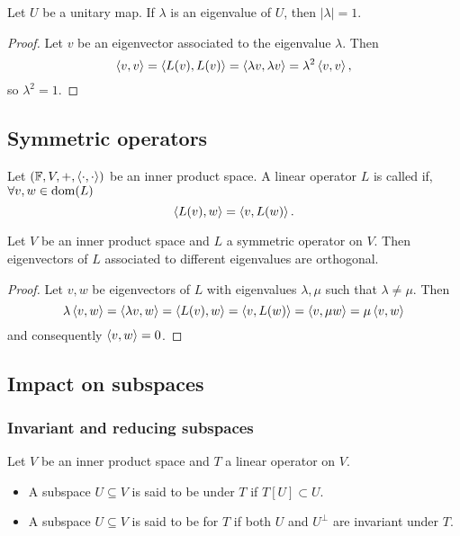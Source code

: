 \begin{lemma}
Let $U$ be a unitary map. If $\lambda$ is an eigenvalue of $U$, then $|\lambda| = 1$.
\end{lemma}
\begin{proof}
Let $v$ be an eigenvector associated to the eigenvalue $\lambda$. Then
\[ \left\langle v,v \right\rangle = \left\langle L(v),L(v) \right\rangle = \left\langle \lambda v, \lambda v \right\rangle = \lambda^2\left\langle v,v \right\rangle,  \]
so $\lambda^2 = 1$.
\end{proof}

\subsection{Symmetric operators}
\begin{definition}
Let $(\mathbb{F},V,+,\left\langle \cdot,\cdot \right\rangle)$ be an inner product space. A linear operator $L$ is called  if, $\forall v,w\in \operatorname{dom}(L)$
\[ \left\langle L(v),w \right\rangle = \left\langle v,L(w) \right\rangle. \]
\end{definition}

\begin{proposition}
Let $V$ be an inner product space and $L$ a symmetric operator on $V$. Then eigenvectors of $L$ associated to different eigenvalues are orthogonal.
\end{proposition}
\begin{proof}
Let $v,w$ be eigenvectors of $L$ with eigenvalues $\lambda, \mu$ such that $\lambda \neq \mu$. Then
\[ \lambda\left\langle v,w \right\rangle = \left\langle \lambda v,w \right\rangle=\left\langle L(v),w \right\rangle = \left\langle v,L(w) \right\rangle = \left\langle v,\mu w \right\rangle = \mu \left\langle v,w \right\rangle \]
and consequently $\left\langle v,w \right\rangle =0$.
\end{proof}

\subsection{Impact on subspaces}
\subsubsection{Invariant and reducing subspaces}
\begin{definition}
Let $V$ be an inner product space and $T$ a linear operator on $V$.
\begin{itemize}
\item A subspace $U\subseteq V$ is said to be  under $T$ if $T[U] \subset U$.
\item A subspace $U\subseteq V$ is said to be  for $T$ if both $U$ and $U^\perp$ are invariant under $T$.
\end{itemize}
\end{definition}

